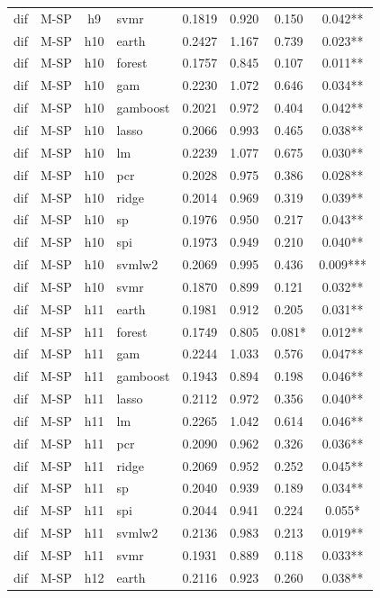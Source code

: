 \begin{ThreePartTable}
\begin{longtable}[t]{llclcccc}
dif & M-SP & h9 & svmr & 0.1819 & 0.920 & 0.150 & 0.042**\\
\addlinespace
dif & M-SP & h10 & earth & 0.2427 & 1.167 & 0.739 & 0.023**\\
dif & M-SP & h10 & forest & 0.1757 & 0.845 & 0.107 & 0.011**\\
dif & M-SP & h10 & gam & 0.2230 & 1.072 & 0.646 & 0.034**\\
dif & M-SP & h10 & gamboost & 0.2021 & 0.972 & 0.404 & 0.042**\\
dif & M-SP & h10 & lasso & 0.2066 & 0.993 & 0.465 & 0.038**\\
dif & M-SP & h10 & lm & 0.2239 & 1.077 & 0.675 & 0.030**\\
dif & M-SP & h10 & pcr & 0.2028 & 0.975 & 0.386 & 0.028**\\
dif & M-SP & h10 & ridge & 0.2014 & 0.969 & 0.319 & 0.039**\\
dif & M-SP & h10 & sp & 0.1976 & 0.950 & 0.217 & 0.043**\\
dif & M-SP & h10 & spi & 0.1973 & 0.949 & 0.210 & 0.040**\\
dif & M-SP & h10 & svmlw2 & 0.2069 & 0.995 & 0.436 & 0.009***\\
dif & M-SP & h10 & svmr & 0.1870 & 0.899 & 0.121 & 0.032**\\
\addlinespace
dif & M-SP & h11 & earth & 0.1981 & 0.912 & 0.205 & 0.031**\\
dif & M-SP & h11 & forest & 0.1749 & 0.805 & 0.081* & 0.012**\\
dif & M-SP & h11 & gam & 0.2244 & 1.033 & 0.576 & 0.047**\\
dif & M-SP & h11 & gamboost & 0.1943 & 0.894 & 0.198 & 0.046**\\
dif & M-SP & h11 & lasso & 0.2112 & 0.972 & 0.356 & 0.040**\\
dif & M-SP & h11 & lm & 0.2265 & 1.042 & 0.614 & 0.046**\\
dif & M-SP & h11 & pcr & 0.2090 & 0.962 & 0.326 & 0.036**\\
dif & M-SP & h11 & ridge & 0.2069 & 0.952 & 0.252 & 0.045**\\
dif & M-SP & h11 & sp & 0.2040 & 0.939 & 0.189 & 0.034**\\
dif & M-SP & h11 & spi & 0.2044 & 0.941 & 0.224 & 0.055*\\
dif & M-SP & h11 & svmlw2 & 0.2136 & 0.983 & 0.213 & 0.019**\\
dif & M-SP & h11 & svmr & 0.1931 & 0.889 & 0.118 & 0.033**\\
\addlinespace
dif & M-SP & h12 & earth & 0.2116 & 0.923 & 0.260 & 0.038**\\

\end{longtable}
\end{ThreePartTable}
